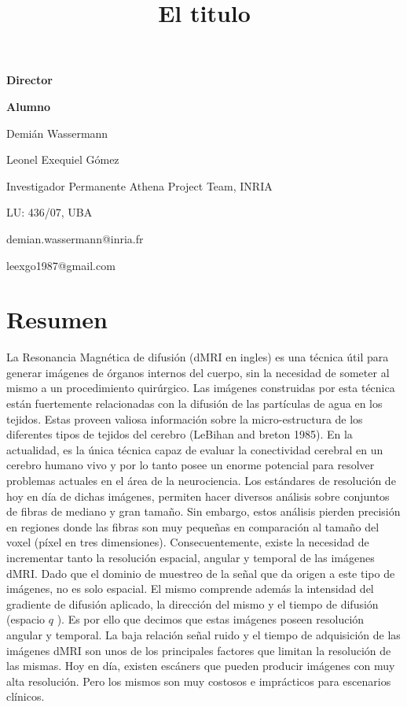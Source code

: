 \documentclass[a4paper,10pt]{article}
\title{El titulo}
\newcommand\textline[3][t]{%
  \par\smallskip\noindent\parbox[#1]{.658\textwidth}
  {\raggedright#2}%
  \parbox[#1]{.333\textwidth}{\raggedleft#3}%
}
\begin{document}
{
\textline[t]{\textbf{Director}}{\textbf{Alumno}}
\textline[t]{Demián Wassermann}{Leonel Exequiel G\'omez}
\textline[t]{Investigador Permanente Athena Project Team, INRIA}{LU: 436/07, UBA}
\textline[t]{demian.wassermann@inria.fr}{leexgo1987@gmail.com}
}


\section*{Resumen}


La Resonancia Magnética de difusión (dMRI en ingles) es una técnica útil para generar imágenes de 
órganos internos del cuerpo, sin la necesidad de someter al mismo a un procedimiento quirúrgico. Las imágenes 
construidas por esta técnica están fuertemente relacionadas con la difusión de las partículas de agua en los tejidos. 
Estas proveen valiosa información sobre la micro-estructura de los diferentes tipos de tejidos del cerebro 
(LeBihan and breton 1985). En la actualidad, es la única técnica capaz de evaluar 
la conectividad cerebral en un cerebro humano vivo y por lo tanto posee un enorme potencial para resolver problemas 
actuales en el área de la neurociencia. Los estándares de resolución de hoy en día de dichas imágenes, permiten hacer 
diversos análisis sobre conjuntos de fibras de mediano y gran tamaño. Sin embargo, estos análisis 
pierden precisión en regiones donde las fibras son muy pequeñas en comparación al tamaño del voxel (píxel en tres 
dimensiones). Consecuentemente, existe la necesidad de incrementar tanto la resolución espacial, angular y temporal de 
las imágenes dMRI. Dado que el dominio de muestreo de la señal que da origen a este tipo de imágenes, no es solo 
espacial. El mismo comprende además la intensidad del gradiente de difusión aplicado, la dirección del mismo y el 
tiempo de difusión (espacio $q$ \citep{CALLAGHAN1990177}). Es por ello que decimos que estas imágenes poseen resolución 
angular y temporal. La baja relaci\'on se\~nal ruido y el tiempo de adquisici\'on de las imágenes dMRI son unos de los 
principales factores que limitan la resolución de las mismas. %
Hoy en día, existen escáners que pueden 
producir imágenes con muy alta resolución. Pero los mismos son muy costosos e 
imprácticos para escenarios clínicos.
\end{document}
